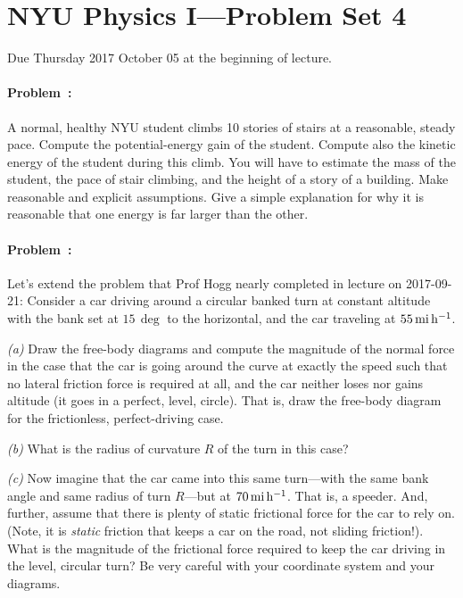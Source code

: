 \documentclass[12pt]{article}
\begin{document}
\section*{NYU Physics I---Problem Set 4}

Due Thursday 2017 October 05 at the beginning of lecture.

\paragraph{Problem~\theproblem:}%
A normal, healthy NYU student climbs 10 stories of stairs at a
reasonable, steady pace. Compute the potential-energy gain of the
student. Compute also the kinetic energy of the student during this
climb. You will have to estimate the mass of the student, the pace of
stair climbing, and the height of a story of a building. Make
reasonable and explicit assumptions. Give a simple explanation for why
it is reasonable that one energy is far larger than the other.

\paragraph{Problem~\theproblem:}%
Let's extend the problem that Prof Hogg nearly completed in lecture
on 2017-09-21: Consider a car driving around a circular banked turn at
constant altitude with the bank set at $15\,\deg$ to the horizontal,
and the car traveling at $55\,\mathrm{mi}\,\mathrm{h}^{-1}$.

\textsl{(a)} Draw the free-body diagrams and compute the magnitude of
the normal force in the case that the car is going around the curve at
exactly the speed such that no lateral friction force is required at
all, and the car neither loses nor gains altitude (it goes in a
perfect, level, circle). That is, draw the free-body diagram for the
frictionless, perfect-driving case.

\textsl{(b)} What is the radius of curvature $R$ of the turn in this
case?

\textsl{(c)} Now imagine that the car came into this same turn---with
the same bank angle and same radius of turn $R$---but at
$70\,\mathrm{mi}\,\mathrm{h}^{-1}$. That is, a speeder. And, further, assume that there is
plenty of static frictional force for the car to rely on. (Note, it is
\emph{static} friction that keeps a car on the road, not sliding
friction!). What is the magnitude of the frictional force required to
keep the car driving in the level, circular turn? Be very careful with
your coordinate system and your diagrams.
\end{document}

